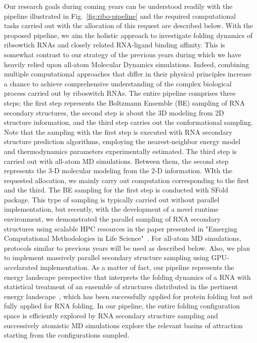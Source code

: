 \documentclass[a4paper,10pt]{article}
\begin{document}
Our research goals during coming years can be understood readily with the pipeline illustrated in Fig.~\ref{fig:ribo-pipeline} and the required computational tasks carried out with the allocation of this request are described below. With the proposed pipeline, we aim the holistic approach to investigate folding dynamics of ribsowtich RNAs and closely related RNA-ligand binding affinity.  This is somewhat contrast to our strategy of the previous years during which we have heavily relied upon all-atom Molecular Dynamics simulations.  Indeed, combining multiple computational approaches that differ in their physical principles increase a chance to achieve comprehensive understanding of the complex biological process carried out by riboswitch RNAs.  The entire pipeline comprises three steps; the first step represents the Boltzmann Ensemble (BE) sampling of RNA secondary structures, the second step is about the 3D modeling from 2D structure information, and the third step carries out the conformational sampling.  Note that the sampling with the first step is executed with RNA secondary structure prediction algorithms, employing the nearest-neighbor energy model and thermodynamics parameters experimentally estimated.  The third step is carried out with all-atom MD simulations.  Between them, the second step represents the 3-D molecular modeling from the 2-D information.  WIth the requested allocation, we mainly carry out computation corresponding to the first and the third.  The BE sampling for the first step is conducted with SFold package\cite{ding2006}.  This type of sampling is typically carried out without parallel implementation, but recently, with the development of a novel runtime environment, we demonstrated the parallel sampling of RNA secondary structures using scalable HPC resources in the paper presented in "Emerging Computational Methodologies in Life Science"~\cite{ecmls10}. For all-atom MD simulations, protocols similar to previous years will be used as described below.  Also, we plan to implement massively parallel secondary structure sampling using GPU-accelarated implementation.   As a matter of fact, our pipeline represents the energy landscape perspective that interprets the folding dynamics of a RNA with statistical treatment of an ensemble of structures distributed in the pertinent energy landscape~\cite{onuchic1997}, which has been successfully applied for protein folding but not fully applied for RNA folding\cite{cupal1997}. In our pipeline,  the entire folding configuration space is efficiently explored by RNA secondary structure sampling and successively atomistic MD simulations explore the relevant basins of attraction starting from the configurations sampled.     
\end{document}
